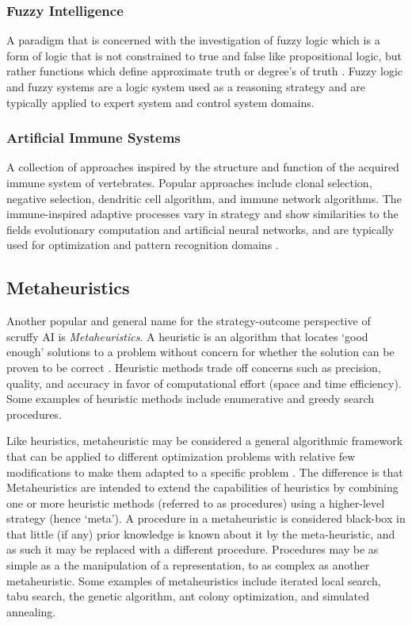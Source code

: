 \subsubsection{Fuzzy Intelligence}
A paradigm that is concerned with the investigation of fuzzy logic which is a form of logic that is not constrained to true and false like propositional logic, but rather functions which define approximate truth or degree’s of truth \cite{Zadeh1996}. Fuzzy logic and fuzzy systems are a logic system used as a reasoning strategy and are typically applied to expert system and control system domains.

\subsubsection{Artificial Immune Systems}
A collection of approaches inspired by the structure and function of the acquired immune system of vertebrates. Popular approaches include clonal selection, negative selection, dendritic cell algorithm, and immune network algorithms. The immune-inspired adaptive processes vary in strategy and show similarities to the fields evolutionary computation and artificial neural networks, and are typically used for optimization and pattern recognition domains \cite{Castro2002}.  

% 
% 
\subsection{Metaheuristics}
\label{sec:metaheuristics}
Another popular and general name for the strategy-outcome perspective of scruffy AI is \emph{Metaheuristics}. 
A heuristic is an algorithm that locates `good enough' solutions to a problem without concern for whether the solution can be proven to be correct \cite{Michalewicz2004}. Heuristic methods trade off concerns such as precision, quality, and accuracy in favor of computational effort (space and time efficiency). Some examples of heuristic methods include enumerative and greedy search procedures.

Like heuristics, metaheuristic may be considered a general algorithmic framework that can be applied to different optimization problems with relative few modifications to make them adapted to a specific problem \cite{Glover2003, Talbi2009}. The difference is that Metaheuristics are intended to extend the capabilities of heuristics by combining one or more heuristic methods (referred to as procedures) using a higher-level strategy (hence `meta'). A procedure in a metaheuristic is considered black-box in that little (if any) prior knowledge is known about it by the meta-heuristic, and as such it may be replaced with a different procedure. Procedures may be as simple as a the manipulation of a representation, to as complex as another metaheuristic. Some examples of metaheuristics include iterated local search, tabu search, the genetic algorithm, ant colony optimization, and simulated annealing.

